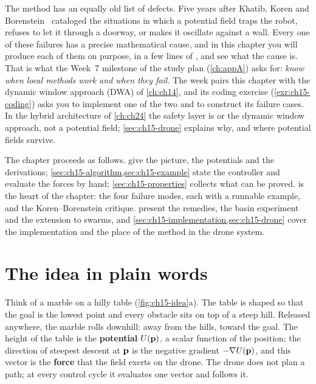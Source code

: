 The method has an equally old list of defects. Five years after Khatib, Koren
and Borenstein~\cite{koren1991potential} cataloged the situations in which a
potential field traps the robot, refuses to let it through a doorway, or makes
it oscillate against a wall. Every one of these failures has a precise
mathematical cause, and in this chapter you will produce each of them on
purpose, in a few lines of \python, and see what the cause is. That is what
the Week~7 milestone of the study plan (\cref{ch:appA}) asks for: \emph{know
when local methods work and when they fail}. The week pairs this chapter with
the dynamic window approach (DWA)
 of \cref{ch:ch14}, and its coding exercise
(\cref{exr:ch15-coding}) asks you to implement one of the two and to construct
its failure cases. In the hybrid architecture of \cref{ch:ch24} the safety
layer is \orca or the dynamic window approach, not a potential field;
\cref{sec:ch15-drone} explains why, and where potential fields survive.

The chapter proceeds as follows. 
give the picture, the potentials and the derivations;
\cref{sec:ch15-algorithm,sec:ch15-example} state the controller and evaluate
the forces by hand; \cref{sec:ch15-properties} collects what can be proved.
 is the heart of the chapter: the four failure modes,
each with a runnable example, and the Koren--Borenstein critique.
 present the remedies, the basin
experiment and the extension to swarms, and
\cref{sec:ch15-implementation,sec:ch15-drone} cover the implementation and
the place of the method in the drone system.

\section{The idea in plain words}
\label{sec:ch15-intuition}

Think of a marble on a hilly table (\cref{fig:ch15-idea}a). The table is
shaped so that the goal is the lowest point and every obstacle sits on top of
a steep hill. Released anywhere, the marble rolls downhill: away from the
hills, toward the goal. The height of the table is the
\textbf{potential} $U(\mathbf{p})$, a scalar function of the
position; the direction of steepest descent at $\mathbf{p}$ is the negative
gradient $-\nabla U(\mathbf{p})$, and this vector is the \textbf{force} that the field exerts on the drone. The drone does not
plan a path; at every control cycle it evaluates one vector and follows it.

